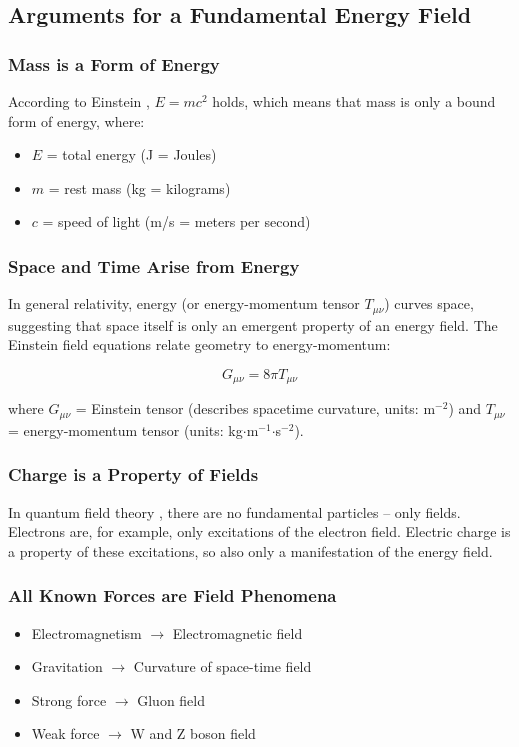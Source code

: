 \documentclass[12pt,a4paper]{article}
\begin{document}
	\subsection{Arguments for a Fundamental Energy Field}
	
	\subsubsection{Mass is a Form of Energy}
	According to Einstein \cite{Einstein1905}, $E = mc^2$ holds, which means that mass is only a bound form of energy, where:
	\begin{itemize}
		\item $E$ = total energy (J = Joules)
		\item $m$ = rest mass (kg = kilograms)
		\item $c$ = speed of light (m/s = meters per second)
	\end{itemize}
	
	\subsubsection{Space and Time Arise from Energy}
	In general relativity, energy (or energy-momentum tensor $T_{\mu\nu}$) curves space, suggesting that space itself is only an emergent property of an energy field. The Einstein field equations relate geometry to energy-momentum:
	
	\begin{equation}
		G_{\mu\nu} = 8\pi T_{\mu\nu}
	\end{equation}
	
	where $G_{\mu\nu}$ = Einstein tensor (describes spacetime curvature, units: m$^{-2}$) and $T_{\mu\nu}$ = energy-momentum tensor (units: kg$\cdot$m$^{-1}$$\cdot$s$^{-2}$).
	
	\subsubsection{Charge is a Property of Fields}
	In quantum field theory \cite{Weinberg1995}, there are no fundamental particles – only fields. Electrons are, for example, only excitations of the electron field. Electric charge is a property of these excitations, so also only a manifestation of the energy field.
	
	\subsubsection{All Known Forces are Field Phenomena}
	\begin{itemize}
		\item Electromagnetism $\rightarrow$ Electromagnetic field
		\item Gravitation $\rightarrow$ Curvature of space-time field
		\item Strong force $\rightarrow$ Gluon field
		\item Weak force $\rightarrow$ W and Z boson field
	\end{itemize}
	
\end{document}
